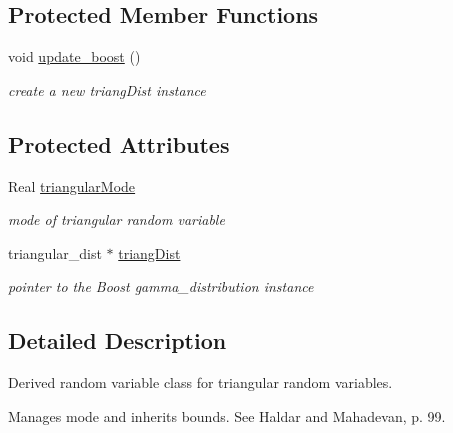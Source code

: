 \subsection*{Protected Member Functions}
\begin{DoxyCompactItemize}
\item 
void \hyperlink{classPecos_1_1TriangularRandomVariable_aaa6750cbee2245416a6eeeac58d4405a}{update\+\_\+boost} ()\label{classPecos_1_1TriangularRandomVariable_aaa6750cbee2245416a6eeeac58d4405a}

\begin{DoxyCompactList}\small\item\em create a new triang\+Dist instance \end{DoxyCompactList}\end{DoxyCompactItemize}
\subsection*{Protected Attributes}
\begin{DoxyCompactItemize}
\item 
Real \hyperlink{classPecos_1_1TriangularRandomVariable_a71b8831187fb4e3bd459e7ad904f330a}{triangular\+Mode}\label{classPecos_1_1TriangularRandomVariable_a71b8831187fb4e3bd459e7ad904f330a}

\begin{DoxyCompactList}\small\item\em mode of triangular random variable \end{DoxyCompactList}\item 
triangular\+\_\+dist $\ast$ \hyperlink{classPecos_1_1TriangularRandomVariable_af79cf8f7ba77d2e83927615c8578a586}{triang\+Dist}\label{classPecos_1_1TriangularRandomVariable_af79cf8f7ba77d2e83927615c8578a586}

\begin{DoxyCompactList}\small\item\em pointer to the Boost gamma\+\_\+distribution instance \end{DoxyCompactList}\end{DoxyCompactItemize}


\subsection{Detailed Description}
Derived random variable class for triangular random variables. 

Manages mode and inherits bounds. See Haldar and Mahadevan, p. 99. 

